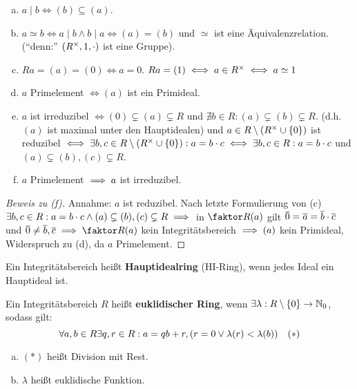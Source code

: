 \documentclass[a4paper]{report}
\begin{document}
\begin{bem}[Übung]\item
\begin{enumerate}[(a)]
  \item $a \mid b \iff (b) \subseteq (a)$.
  \item $a \simeq b \iff a \mid b \wedge b \mid a \iff (a) = (b)$ und $\simeq$ ist eine Äquivalenzrelation. (``denn:'' $(R^\times, 1, \cdot)$ ist eine Gruppe).
  \item $Ra = (a) = (0) \iff a = 0$. $Ra = (1) \iff a \in R^\times \iff a \simeq 1$
  \item $a$ Primelement $\iff (a)$ ist ein Primideal.
  \item $a$ ist irreduzibel $\iff (0) \subsetneq (a) \subsetneq R$ und $\nexists b \in R : (a) \subsetneq (b) \subsetneq R$. (d.h. $(a)$ ist maximal unter den Hauptidealen) und $a \in R \setminus (R^\times \cup \{0\})$ ist reduzibel $\iff \exists b, c \in R \setminus (R^\times \cup \{0\}): a = b \cdot c \iff \exists b, c \in R : a = b \cdot c$ und $(a) \subsetneq (b), (c) \subsetneq R$.
  \item $a$ Primelement $\implies a$ ist irreduzibel.
\end{enumerate}
\end{bem}
\begin{proof}[Beweis zu (f)]
  Annahme: $a$ ist reduzibel. Nach letzte Formulierung von (c) $\exists b, c \in R : a = b \cdot c \wedge (a) \subsetneq (b), (c) \subsetneq R \implies$ in $\fak R{(a)}$ gilt $\overline 0 = \overline a = \overline b \cdot \overline c$ und $\bar 0 \ne \bar b, \bar c \imp \fak R {(a)}$ kein Integritätsbereich $\implies (a)$ kein Primideal, Widerspruch zu (d), da $a$ Primelement.
\end{proof}

\begin{defi}
Ein Integritätsbereich heißt \textbf{Hauptidealring} (HI-Ring), wenn jedes Ideal ein Hauptideal ist.
\end{defi}
\begin{defi}
  Ein Integritätsbereich $R$ heißt \textbf{euklidischer Ring}, wenn $\exists \lambda : R \setminus \{0\} \to \mathbb{N}_0$, sodass gilt:
  \[\forall a, b \in R \exists q, r \in R : a = qb + r, (r = 0 \vee \lambda (r) < \lambda(b)) \quad (*)\]
\end{defi}
\begin{bez*}\item
\begin{enumerate}[(a)]
  \item $(*)$ heißt Division mit Rest.
  \item $\lambda$ heißt euklidische Funktion.
\end{enumerate}
\end{bez*}
\end{document}
